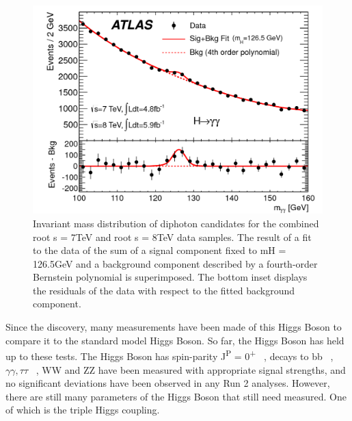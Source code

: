 \begin{figure}[h]
\begin{center}
\includegraphics[scale=0.25]{figures/higgs_disc}
\caption{Invariant mass distribution of diphoton candidates for the combined root s = 7TeV and root s = 8TeV data samples. The result of a fit to the data of the sum of a signal component fixed to mH = 126.5GeV and a background component described by a fourth-order Bernstein polynomial is superimposed. The bottom inset displays the residuals of the data with respect to the fitted background component.}
\label{fig:Higgs}
\end{center}
\end{figure}

Since the discovery, many measurements have been made of this Higgs Boson to compare it to the standard model Higgs Boson. So far, the Higgs Boson has held up to these tests. The Higgs Boson has spin-parity J\textsuperscript{P} = 0\textsuperscript{+} ~\cite{Aad:2013xqa}, decays to bb ~\cite{Aaboud:2018zhk}, ${\gamma\gamma, \tau\tau}$ ~\cite{Aaboud:2018pen}, WW and ZZ have been measured with appropriate signal strengths, and no significant deviations have been observed in any Run 2 analyses. However, there are still many parameters of the Higgs Boson that still need measured. One of which is the triple Higgs coupling.
